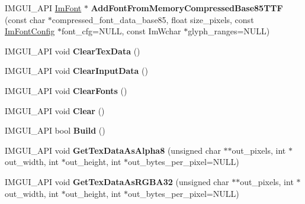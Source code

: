 \begin{DoxyCompactItemize}
\mbox{\label{struct_im_font_atlas_ab43b930beb57c0b998f42f4586677956}} 
I\+M\+G\+U\+I\+\_\+\+A\+PI \hyperlink{struct_im_font}{Im\+Font} $\ast$ {\bfseries Add\+Font\+From\+Memory\+Compressed\+Base85\+T\+TF} (const char $\ast$compressed\+\_\+font\+\_\+data\+\_\+base85, float size\+\_\+pixels, const \hyperlink{struct_im_font_config}{Im\+Font\+Config} $\ast$font\+\_\+cfg=N\+U\+LL, const Im\+Wchar $\ast$glyph\+\_\+ranges=N\+U\+LL)
\item 
\mbox{\label{struct_im_font_atlas_a3ede4bd513bec044c77ac392ad9c6e86}} 
I\+M\+G\+U\+I\+\_\+\+A\+PI void {\bfseries Clear\+Tex\+Data} ()
\item 
\mbox{\label{struct_im_font_atlas_a3f5bcbb7a2683b1af106fcf4e1217662}} 
I\+M\+G\+U\+I\+\_\+\+A\+PI void {\bfseries Clear\+Input\+Data} ()
\item 
\mbox{\label{struct_im_font_atlas_ad5c2560d708bd0c389e9bd9da2d9b055}} 
I\+M\+G\+U\+I\+\_\+\+A\+PI void {\bfseries Clear\+Fonts} ()
\item 
\mbox{\label{struct_im_font_atlas_a8f6d01c671d8670f991ba651bbaf7e77}} 
I\+M\+G\+U\+I\+\_\+\+A\+PI void {\bfseries Clear} ()
\item 
\mbox{\label{struct_im_font_atlas_a81e39e30dffa4dd7e458a53297451e27}} 
I\+M\+G\+U\+I\+\_\+\+A\+PI bool {\bfseries Build} ()
\item 
\mbox{\label{struct_im_font_atlas_aeff1a1044a1ab68d8f27bb2819cd9f44}} 
I\+M\+G\+U\+I\+\_\+\+A\+PI void {\bfseries Get\+Tex\+Data\+As\+Alpha8} (unsigned char $\ast$$\ast$out\+\_\+pixels, int $\ast$out\+\_\+width, int $\ast$out\+\_\+height, int $\ast$out\+\_\+bytes\+\_\+per\+\_\+pixel=N\+U\+LL)
\item 
\mbox{\label{struct_im_font_atlas_a8abb0c4e67ebb38249d4df71218c4eec}} 
I\+M\+G\+U\+I\+\_\+\+A\+PI void {\bfseries Get\+Tex\+Data\+As\+R\+G\+B\+A32} (unsigned char $\ast$$\ast$out\+\_\+pixels, int $\ast$out\+\_\+width, int $\ast$out\+\_\+height, int $\ast$out\+\_\+bytes\+\_\+per\+\_\+pixel=N\+U\+LL)
\item 
\mbox{\label{struct_im_font_atlas_a96ffd1956c11dac4f79b43c095828445}} 

\end{DoxyCompactItemize}
